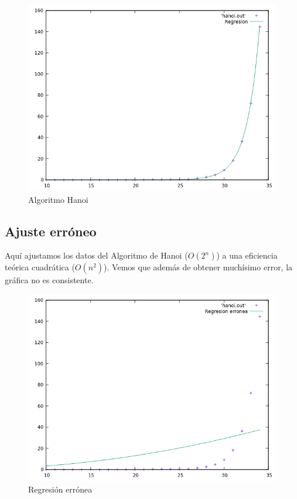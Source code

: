 \documentclass[12pt,spanish]{article}
\begin{document}
\begin{figure}[H]
\centering
\includegraphics[scale=0.75]{hibrida_hanoi.png}
\caption{Algoritmo Hanoi}
\end{figure}

\newpage

\subsection{Ajuste erróneo}
Aquí ajustamos los datos del Algoritmo de Hanoi ($O(2^n)$) a una eficiencia teórica cuadrática ($O(n^2)$). Vemos que además de obtener muchísimo error, la gráfica no es consistente.

\begin{figure}[H]
\centering
\includegraphics[scale=0.75]{ajuste_erroneo.png}
\caption{Regresión errónea}
\end{figure}

\end{document}
